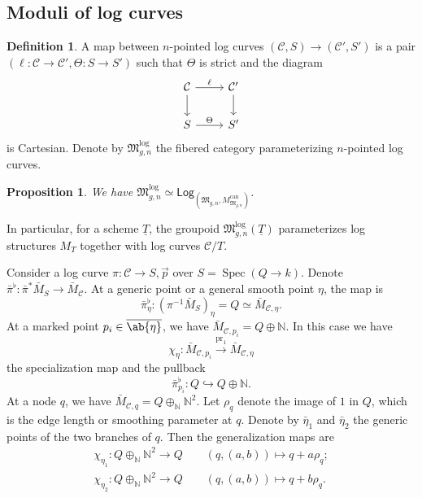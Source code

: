 \documentclass{amsart}
\newtheorem{prop}[thm]{Proposition}
\theoremstyle{definition}
\newtheorem{defn}[thm]{Definition}
\theoremstyle{remark}
\theoremstyle{plain}
\theoremstyle{definition}
\theoremstyle{remark}
\newcommand{\N}{\mathbb{N}}
\newcommand{\mc}[1]{\mathcal{#1}}
\newcommand{\mf}[1]{\mathfrak{#1}}
\newcommand{\on}[1]{\operatorname{#1}}
\newcommand{\ms}[1]{\mathsf{#1}}
\newcommand{\ol}[1]{\overline{#1}}
\newcommand{\ul}[1]{\underline{#1}}
\newcommand{\1}{\mathbf{1}}
\newcommand{\2}{\mathbf{2}}
\newcommand{\3}{\mathbf{3}}
\DeclareMathOperator{\Spec}{Spec}
\begin{document}
\subsection{Moduli of log curves}%
\label{sub:Moduli of log curves}

\begin{defn}
    A map between \(n\)-pointed log curves \((\mc{C}, S) \to (\mc{C}', S')\) is a pair \((\ell \colon \mc{C} \to \mc{C}', \Theta \colon S \to S')\) such that \(\Theta\) is strict and the diagram
    \begin{equation*}
    \begin{tikzcd}
        \mc{C} \ar{d} \ar{r}{\ell} & \mc{C}' \ar{d} \\
        S \ar{r}{\Theta} & S'
    \end{tikzcd}
    \end{equation*}
    is Cartesian. Denote by \(\mf{M}_{g,n}^{\log}\) the fibered category parameterizing \(n\)-pointed log curves.
\end{defn}

\begin{prop}
    We have \(\mf{M}_{g,n}^{\log} \simeq \ms{Log}_{(\mf{M}_{g,n}, M_{\mf{M}_{g,n}}^{\on{can}})}\).
\end{prop}

In particular, for a scheme \(\ul{T}\), the groupoid \(\mf{M}_{g,n}^{\log}(\ul{T})\) parameterizes log structures \(M_T\) together with log curves \(\mc{C} / T\).

Consider a log curve \(\pi \colon \mc{C} \to S, \vec{p}\) over \(S = \Spec (Q \to k)\). Denote \(\bar{\pi}^{\flat} \colon \bar{\pi}^* \bar{M}_S \to \bar{M}_{\mc{C}}\). At a generic point or a general smooth point \(\eta\), the map is
\[ \bar{\pi}_{\eta}^{\flat} \colon (\pi^{-1} \bar{M}_S)_{\eta} = Q \simeq \bar{M}_{\mc{C}, \eta}. \]
At a marked point \(p_i \in \ol{\ab\{\eta\}}\), we have \(\bar{M}_{\mc{C}, p_i} = Q \oplus \N\). In this case we have
\[ \chi_{\eta} \colon \bar{M}_{\mc{C}, p_i} \xrightarrow{\on{pr}_1} \bar{M}_{\mc{C}, \eta} \]
the specialization map and the pullback
\[ \bar{\pi}_{p_i}^{\flat} \colon Q \hookrightarrow Q \oplus \N. \]
At a node \(q\), we have \(\bar{M}_{\mc{C}, q} = Q \oplus_{\N} \N^2\). Let \(\rho_q\) denote the image of \(1\) in \(Q\), which is the edge length or smoothing parameter at \(q\). Denote by \(\bar{\eta}_1\) and \(\bar{\eta}_2\) the generic points of the two branches of \(q\). Then the generalization maps are
\begin{align*}
    \chi_{\eta_1} \colon Q \oplus_{\N} \N^2 \to Q \qquad (q, (a,b)) \mapsto q + a \rho_q ;\\
    \chi_{\eta_2} \colon Q \oplus_{\N} \N^2 \to Q \qquad (q, (a,b)) \mapsto q + b \rho_q .
\end{align*}
\end{document}
